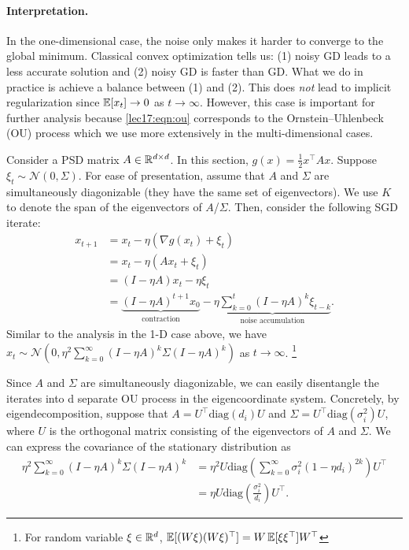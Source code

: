 \paragraph{Interpretation.} In the one-dimensional case, the noise only makes it harder to converge to the global minimum. Classical convex optimization tells us: (1) noisy GD leads to a less accurate solution and (2) noisy GD is faster than GD. What we do in practice is achieve a balance between (1) and (2). This does \textit{not} lead to implicit regularization since $\operatorname*{\mathbb{E}}[x_t] \rightarrow 0$ as $t \rightarrow \infty$. However, this case is important for further analysis because \eqref{lec17:eqn:ou} corresponds to the Ornstein–Uhlenbeck (OU) process which we use more extensively in the multi-dimensional cases.

Consider a PSD matrix $A \in \mathbb R^{d\times d}$. In this section, $g(x) = \frac{1}{2}x^\top A x$. Suppose $\xi_t \sim \mathcal{N}(0, \Sigma)$. For ease of presentation, assume that $A$ and $\Sigma$ are simultaneously diagonizable (they have the same set of eigenvectors). We use $K$ to denote the span of the eigenvectors of $A$/$\Sigma$. Then, consider the following SGD iterate:
\begin{align}
x_{t+1} &= x_t - \eta(\nabla g(x_{t}) + \xi_t)\\
&= x_t - \eta(Ax_t + \xi_t)\\
&= (I- \eta A)x_t - \eta\xi_t\\
&= \underbrace{(I- \eta A)^{t+1} x_0}_{\text{contraction}} - \underbrace{\eta\sum_{k=0}^{t} (I- \eta A)^{k}\xi_{t-k}}_{\text{noise accumulation}}.
\end{align}
Similar to the analysis in the 1-D case above, we have $x_t \sim \mathcal{N}(0, \eta^2\sum_{k=0}^{\infty} (I- \eta A)^{k}\Sigma (I- \eta A)^{k})$ as $t \rightarrow \infty$. \footnote{For random variable $\xi\in \mathbb R^d$, $\operatorname*{\mathbb{E}}[(W\xi)(W\xi)^\top] = W\operatorname*{\mathbb{E}}[\xi\xi^\top]W^\top$}

Since $A$ and $\Sigma$ are simultaneously diagonizable, we can easily disentangle the iterates into d separate OU process in the eigencoordinate system. Concretely, by eigendecomposition, suppose that $A = U^\top \text{diag}(d_i) U$ and $\Sigma = U^\top \text{diag}(\sigma_i^2) U$, where $U$ is the orthogonal matrix consisting of the eigenvectors of $A$ and $\Sigma$. We can express the covariance of the stationary distribution as
\begin{align}
\eta^2\sum_{k=0}^{\infty} (I- \eta A)^{k}\Sigma (I- \eta A)^{k} &= \eta^2 U\text{diag}\left(\sum_{k=0}^{\infty}\sigma_i^2(1-\eta d_i)^{2k}\right)U^\top\\
&= \eta U\text{diag}\left(\frac{\sigma_i^2}{d_i}\right)U^\top.
\end{align}
